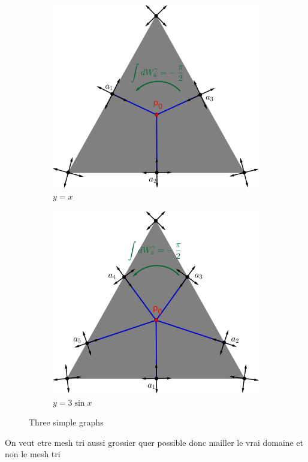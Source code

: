 \begin{figure}
     \centering
     \begin{subfigure}[b]{0.49\textwidth}
         \centering
         \includegraphics[width=\textwidth]{images/triangle separatrices 3.png}
         \caption{$y=x$}
         \label{fig:y equals x}
     \end{subfigure}
     \hfill
     \begin{subfigure}[b]{0.49\textwidth}
         \centering
         \includegraphics[width=\textwidth]{images/triangle separatrices 5.png}
         \caption{$y=3\sin x$}
         \label{fig:three sin x}
     \end{subfigure}
        \caption{Three simple graphs}
        \label{fig:three graphs}
\end{figure}
On veut etre mesh tri aussi grossier quer possible donc mailler le vrai domaine et non le mesh tri
